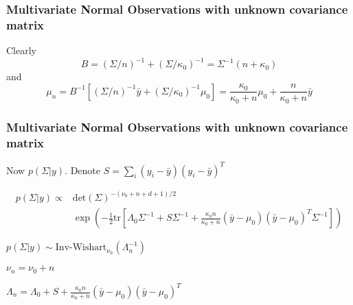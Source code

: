 \documentclass{beamer}
\begin{document}
\begin{frame}[fragile]
\frametitle{Multivariate Normal Observations with unknown covariance matrix}

Clearly 
$$
B = (\Sigma/n)^{-1} + (\Sigma/\kappa_0)^{-1} = \Sigma^{-1}(n + \kappa_0)
$$
and
$$
\mu_n = B^{-1}\left[ (\Sigma/n)^{-1}\bar{y} +  (\Sigma/\kappa_0)^{-1}\mu_0 \right] = \frac{\kappa_0 }{\kappa_0 + n }\mu_0 + \frac{n}{\kappa_0 + n}\bar{y}
$$

\end{frame}


\begin{frame}[fragile]
\frametitle{Multivariate Normal Observations with unknown covariance matrix}

Now $p(\Sigma|y)$. Denote $S = \sum_i (y_i - \bar{y})(y_i -
  \bar{y})^T$

\begin{align*}
p(\Sigma|y) \propto &\mbox{det}(\Sigma)^{-(\nu_0 + n + d + 1)/2}
  \\
  &\exp\left(-\frac{1}{2} \text{tr}\left[\Lambda_0 \Sigma^{-1} + S \Sigma^{-1} + \frac{\kappa_0 n}{\kappa_0 + n} (\bar{y} - \mu_0)(\bar{y} - \mu_0)^T \Sigma^{-1}\right] \right)
\end{align*}

$p(\Sigma|y) \sim \mbox{Inv-Wishart}_{\nu_n}(\Lambda_n^{-1})$

$\nu_n = \nu_0 + n$

$\Lambda_n = \Lambda_0  + S + \frac{\kappa_0 n}{\kappa_0 + n} (\bar{y} - \mu_0)(\bar{y} - \mu_0)^T$ 
\end{frame}



\end{document}
